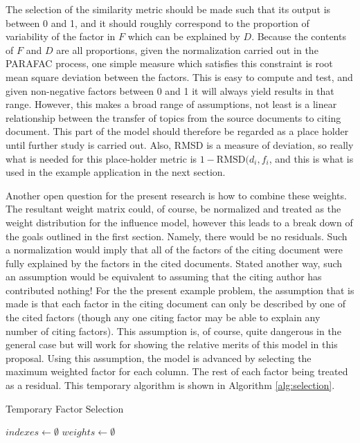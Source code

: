 \documentclass{article}
\begin{document}
The selection of the similarity metric should be made such that its
output is between 0 and 1, and it should roughly correspond to the
proportion of variability of the factor in $F$ which can be explained
by $D$.  Because the contents of $F$ and $D$ are all proportions,
given the normalization carried out in the PARAFAC process, one simple
measure which satisfies this constraint is root mean square deviation
between the factors.  This is easy to compute and test, and given
non-negative factors between 0 and 1 it will always yield results in
that range.  However, this makes a broad range of assumptions, not
least is a linear relationship between the transfer of topics from the
source documents to citing document.  This part of the model should
therefore be regarded as a place holder until further study is carried
out.  Also, RMSD is a measure of deviation, so really what is needed
for this place-holder metric is $1-\mathrm{RMSD}(d_i, f_i$, and this
is what is used in the example application in the next section.

Another open question for the present research is how to combine these
weights.  The resultant weight matrix could, of course, be normalized
and treated as the weight distribution for the influence model,
however this leads to a break down of the goals outlined in the first
section.  Namely, there would be no residuals.  Such a normalization
would imply that all of the factors of the citing document were fully
explained by the factors in the cited documents.  Stated another way,
such an assumption would be equivalent to assuming that the citing
author has contributed nothing!  For the the present example problem,
the assumption that is made is that each factor in the citing document
can only be described by one of the cited factors (though any one
citing factor may be able to explain any number of citing factors).
This assumption is, of course, quite dangerous in the general case but
will work for showing the relative merits of this model in this
proposal.  Using this assumption, the model is advanced by selecting
the maximum weighted factor for each column.  The rest of each factor
being treated as a residual.  This temporary algorithm is shown in
Algorithm \ref{alg:selection}.

\begin{algorithm}
    \caption{Temporary Factor Selection}
    \label{alg:selection}
    $indexes \leftarrow \emptyset$\;
    $weights \leftarrow \emptyset$\;
\end{algorithm}
\end{document}
